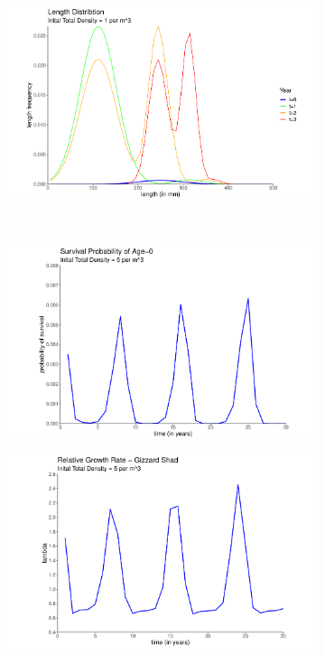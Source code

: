 \documentclass[11pt,oneside]{amsart}
\theoremstyle{definition}
\begin{document}
\begin{figure}
\begin{subfigure}[b]{.3\textwidth}
     \caption{}
\label{}
\end{subfigure}
\begin{subfigure}[b]{.3\textwidth}
   \includegraphics[width=\textwidth]{figures/Figure4c.pdf}
     \caption{}
\label{}  
\end{subfigure} \\
\begin{subfigure}[b]{.3\textwidth}
  \includegraphics[width=\textwidth]{figures/Figure4d.pdf}
   \caption{}
  \label{}
\end{subfigure}
\begin{subfigure}[b]{.3\textwidth}
   \includegraphics[width=\textwidth]{figures/Figure4e.pdf}

\end{subfigure}
\end{figure}
\end{document}
